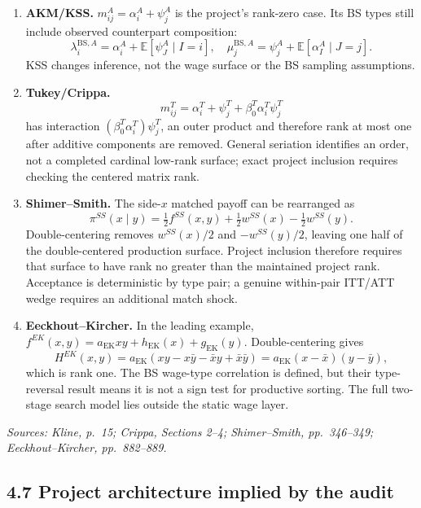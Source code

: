 \documentclass[11pt]{article}
\begin{document}
\begin{enumerate}
\item \textbf{AKM/KSS.}
  \(m^A_{ij}=\alpha_i^A+\psi_j^A\) is the project's rank-zero case.
  Its BS types still include observed counterpart composition:
  \[
  \lambda_i^{\mathrm{BS},A}
  =\alpha_i^A+\mathbb E[\psi_J^A\mid I=i],
  \quad
  \mu_j^{\mathrm{BS},A}
  =\psi_j^A+\mathbb E[\alpha_I^A\mid J=j].
  \tag{T4.28}
  \]
  KSS changes inference, not the wage surface or the BS sampling assumptions.
\item \textbf{Tukey/Crippa.}
  \[
  m^T_{ij}
  =\alpha_i^T+\psi_j^T+\beta_0^T\alpha_i^T\psi_j^T
  \tag{T4.29}
  \]
  has interaction
  \((\beta_0^T\alpha_i^T)\psi_j^T\), an outer product and therefore rank at
  most one after additive components are removed.  General seriation
  identifies an order, not a completed cardinal low-rank surface; exact
  project inclusion requires checking the centered matrix rank.
\item \textbf{Shimer--Smith.}
  The side-\(x\) matched payoff can be rearranged as
  \[
  \pi^{SS}(x\mid y)
  =\tfrac12f^{SS}(x,y)
  +\tfrac12w^{SS}(x)-\tfrac12w^{SS}(y).
  \tag{T4.30}
  \]
  Double-centering removes \(w^{SS}(x)/2\) and
  \(-w^{SS}(y)/2\), leaving one half of the double-centered production
  surface.  Project inclusion therefore requires that surface to
  have rank no greater than the maintained project rank.  Acceptance is
  deterministic by type pair; a genuine within-pair ITT/ATT wedge requires an
  additional match shock.
\item \textbf{Eeckhout--Kircher.}
  In the leading example,
  \(f^{EK}(x,y)=a_{\mathrm{EK}}xy+h_{\mathrm{EK}}(x)+g_{\mathrm{EK}}(y)\).
  Double-centering gives
  \[
  H^{EK}(x,y)
  =
  a_{\mathrm{EK}}
  \left(xy-x\bar y-\bar x y+\bar x\bar y\right)
  =
  a_{\mathrm{EK}}(x-\bar x)(y-\bar y),
  \tag{T4.31}
  \]
  which is rank one.  The BS wage-type correlation is defined, but their type-
  reversal result means it is not a sign test for productive sorting.  The
  full two-stage search model lies outside the static wage layer.
\end{enumerate}

\textit{Sources: Kline, p.\ 15; Crippa, Sections 2--4; Shimer--Smith,
pp.\ 346--349; Eeckhout--Kircher, pp.\ 882--889.}

\subsection{4.7 Project architecture implied by the audit}
\end{document}
